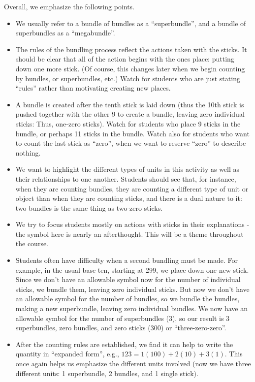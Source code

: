 \documentclass{ximera}
\begin{document}
\begin{instructorNotes}
Overall, we emphasize the following points.
\begin{itemize}
    \item We usually refer to a bundle of bundles as a ``superbundle'', and a bundle of superbundles as a ``megabundle''.
	\item The rules of the bundling process reflect the actions taken with the sticks. It should be clear that all of the action begins with the ones place:  putting down one more stick. (Of course, this changes later when we begin counting by bundles, or superbundles, etc.)  Watch for students who are just stating ``rules'' rather than motivating creating new places.
	\item A bundle is created after the tenth stick is laid down (thus the 10th stick is pushed together with the other 9 to create a bundle, leaving zero individual sticks: Thus, one-zero sticks). Watch for students who place 9 sticks in the bundle, or perhaps 11 sticks in the bundle. Watch also for students who want to count the last stick as ``zero'', when we want to reserve ``zero'' to describe nothing.
	\item We want to highlight the different types of units in this activity as well as their relationships to one another.  Students should see that, for instance, when they are counting bundles, they are counting a different type of unit or object than when they are counting sticks, and there is a dual nature to it: two bundles is the same thing as two-zero sticks.
	\item We try to focus students mostly on actions with sticks in their explanations - the symbol here is nearly an afterthought. This will be a theme throughout the course.
	\item Students often have difficulty when a second bundling must be made.  For example, in the usual base ten, starting at 299, we place down one new stick.  Since we don't have an allowable symbol now for the number of individual sticks, we bundle them, leaving zero individual sticks.  But now we don't have an allowable symbol for the number of bundles, so we bundle the bundles, making a new superbundle, leaving zero individual bundles.  We now have an allowable symbol for the number of superbundles (3), so our result is 3 superbundles, zero bundles, and zero sticks (300) or ``three-zero-zero''.
	\item After the counting rules are established, we find it can help to write the quantity in ``expanded form'', e.g., $123 = 1(100) + 2(10) + 3(1)$. This once again helps us emphasize the different units involved (now we have three different units: 1 superbundle, 2 bundles, and 1 single stick).
	


\end{itemize}
\end{instructorNotes}
\end{document}

